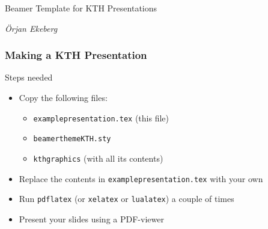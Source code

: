 \documentclass[aspectratio=1610]{beamer}
\begin{document}
\startpage
\begin{frame}

  \vspace{0.02\textheight}
  
  \begin{Large}
    Beamer Template for KTH Presentations
  \end{Large}

  \vspace{0.1\textheight}

  \begin{small}
    \textit{Örjan Ekeberg}
  \end{small}
\end{frame}


\normalpage
\begin{frame}
  \frametitle{Making a KTH Presentation}

  \begin{block}{Steps needed}
    \begin{itemize}
    \item Copy the following files:
    \begin{itemize}
    \item \texttt{examplepresentation.tex} (this file)
    \item \texttt{beamerthemeKTH.sty}
    \item \texttt{kthgraphics} (with all its contents)
    \end{itemize}
    \item Replace the contents in \texttt{examplepresentation.tex} with your own
    \item Run \texttt{pdflatex} (or \texttt{xelatex} or \texttt{lualatex}) a couple of times
    \item Present your slides using a PDF-viewer
    \end{itemize}
  \end{block}

\end{frame}
\end{document}

